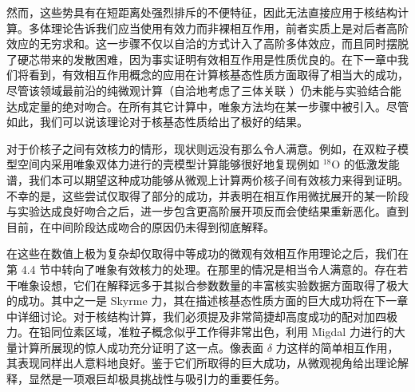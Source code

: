 然而，这些势具有在短距离处强烈排斥的不便特征，因此无法直接应用于核结构计算。多体理论告诉我们应当使用有效力而非裸相互作用，前者实质上是对后者高阶效应的无穷求和。这一步骤不仅以自洽的方式计入了高阶多体效应，而且同时摆脱了硬芯带来的发散困难，因为事实证明有效相互作用是性质优良的。在下一章中我们将看到，有效相互作用概念的应用在计算核基态性质方面取得了相当大的成功，尽管该领域最前沿的纯微观计算（自洽地考虑了三体关联
\cite{KLZ78}）仍未能与实验结合能达成定量的绝对吻合。在所有其它计算中，唯象方法均在某一步骤中被引入。尽管如此，我们可以说该理论对于核基态性质给出了极好的结果。

对于价核子之间有效核力的情形，现状则远没有那么令人满意。例如，在双粒子模型空间内采用唯象双体力进行的壳模型计算能够很好地复现例如 $^{18}\mathrm{O}$
的低激发能谱，我们本可以期望这种成功能够从微观上计算两价核子间有效核力来得到证明。不幸的是，这些尝试仅取得了部分的成功，并表明在相互作用微扰展开的某一阶段与实验达成良好吻合之后，进一步包含更高阶展开项反而会使结果重新恶化。直到目前，在中间阶段达成吻合的原因仍未得到彻底解释。

在这些在数值上极为复杂却仅取得中等成功的微观有效相互作用理论之后，我们在第 4.4 节中转向了唯象有效核力的处理。在那里的情况是相当令人满意的。存在若干唯象设想，它们在解释远多于其拟合参数数量的丰富核实验数据方面取得了极大的成功。其中之一是
Skyrme 力，其在描述核基态性质方面的巨大成功将在下一章中详细讨论。对于核结构计算，我们必须提及非常简捷却高度成功的配对加四极力。在铅同位素区域，准粒子概念似乎工作得非常出色，利用
Migdal 力进行的大量计算所展现的惊人成功充分证明了这一点。像表面 $\delta$ 力这样的简单相互作用，其表现同样出人意料地良好。鉴于它们所取得的巨大成功，从微观视角给出理论解释，显然是一项艰巨却极具挑战性与吸引力的重要任务。
